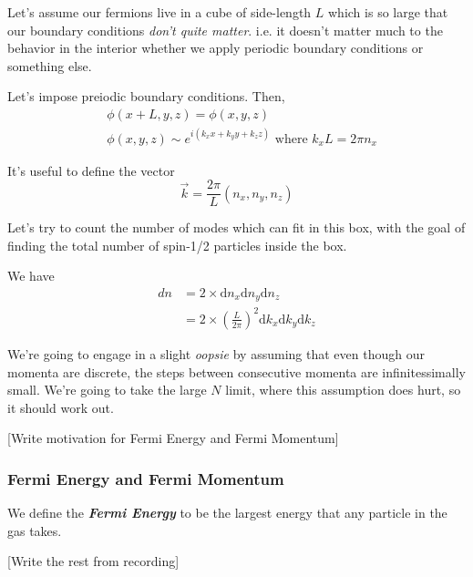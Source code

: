 \documentclass{article}
\begin{document}
\vskip 0.5cm
Let's assume our fermions live in a cube of side-length $L$ which is so large that our boundary conditions \emph{don't quite matter}. i.e. it doesn't matter much to the behavior in the interior whether we apply periodic boundary conditions or something else.

\vskip 0.5cm
Let's impose preiodic boundary conditions. Then,
\begin{align*}
  &\phi(x+ L, y, z) = \phi(x, y, z) \\
  &\phi(x, y, z) \sim e^{i\left(k_x x + k_y y + k_z z\right)} \text{ where } k_xL = 2\pi n_x
\end{align*}

It's useful to define the vector
\[ \vec{k} = \frac{2\pi}{L} \left(n_x, n_y, n_z\right) \]

\vskip 0.5cm
Let's try to count the number of modes which can fit in this box, with the goal of finding the total number of spin-1/2 particles inside the box.

\vskip 0.5cm
We have 
\begin{align*}
  dn &= 2 \times \mathrm{d}n_x \mathrm{d}n_y \mathrm{d}n_z \\
  &= 2 \times \left(\frac{L}{2\pi}\right)^2 \mathrm{d}k_x \mathrm{d}k_y \mathrm{d}k_z
\end{align*}

\vskip 0.5cm
We're going to engage in a slight \emph{oopsie} by assuming that even though our momenta are discrete, the steps between consecutive momenta are infinitessimally small. We're going to take the large $N$ limit, where this assumption does hurt, so it should work out.

\vskip 0.5cm
[Write motivation for Fermi Energy and Fermi Momentum]

\vskip 0.5cm
\subsubsection*{Fermi Energy and Fermi Momentum}

\begin{mathdefinitionbox}{}
  We define the \emph{\textbf{Fermi Energy}} to be the largest energy that any particle in the gas takes.
\end{mathdefinitionbox}

\vskip 1cm
[Write the rest from recording]
\end{document}
